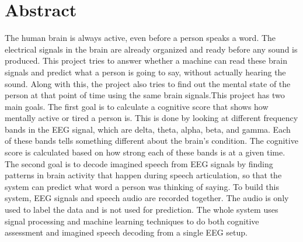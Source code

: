 \chapter*{Abstract}
\thispagestyle{plain}
The human brain is always active, even before a person speaks a word. The electrical signals in the brain are already organized and ready before any sound is produced. This project tries to answer whether a machine can read these brain signals and predict what a person is going to say, without actually hearing the sound. Along with this, the project also tries to find out the mental state of the person at that point of time using the same brain signals.This project has two main goals. The first goal is to calculate a cognitive score that shows how mentally active or tired a person is. This is done by looking at different frequency bands in the EEG signal, which are delta, theta, alpha, beta, and gamma. Each of these bands tells something different about the brain's condition. The cognitive score is calculated based on how strong each of these bands is at a given time.\\


The second goal is to decode imagined speech from EEG signals by finding patterns in brain activity that happen during speech articulation, so that the system can predict what word a person was thinking of saying.
To build this system, EEG signals and speech audio are recorded together. The audio is only used to label the data and is not used for prediction. The whole system uses signal processing and machine learning techniques to do both cognitive assessment and imagined speech decoding from a single EEG setup.










